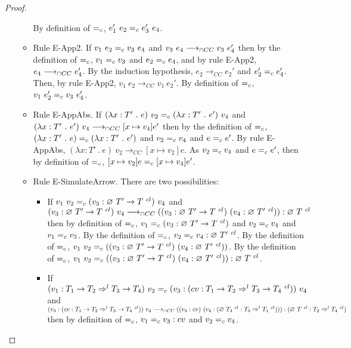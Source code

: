 \documentclass[a4paper]{article}
\begin{document}
\begin{proof}
\begin{itemize}
\begin{itemize}
        By definition of $=_c$, $e_1'\ e_2 \equalityCasts e_3'\ e_4$.
        \item Rule E-App2.
        If $v_1\ e_2 =_c v_3\ e_4$ and $v_3\ e_4 \longrightarrow_{\cap CC} v_3\ e_4'$ then by the definition of $=_c$, $v_1 =_c v_3$ and $e_2 =_c e_4$, and by rule E-App2, $e_4 \longrightarrow_{\cap CC} e_4'$.
        By the induction hypothesis, $e_2 \longrightarrow_{CC} e_2'$ and $e_2' =_c e_4'$.
        Then, by rule E-App2, $v_1\ e_2 \longrightarrow_{CC} v_1\ e_2'$.
        By definition of $=_c$, $v_1\ e_2' \equalityCasts v_3\ e_4'$.
        \item Rule E-AppAbs.
        If $(\lambda x : T'\ .\ e)\ v_2 \equalityCasts (\lambda x : T'\ .\ e')\ v_4$ and $(\lambda x : T'\ .\ e')\ v_4 \longrightarrow_{\cap CC} [x \mapsto v_4]e'$ then by the definition of $=_c$, $(\lambda x : T'\ .\ e) =_c (\lambda x : T'\ .\ e')$ and $v_2 =_c v_4$ and $e =_c e'$.
        By rule E-AppAbs, $(\lambda x : T'\ .\ e)\ v_2 \longrightarrow_{CC} [x \mapsto v_2]e$.
        As $v_2 =_c v_4$ and $e =_c e'$, then by definition of $=_c$, $[x \mapsto v_2]e =_c [x \mapsto v_4]e'$.
        \item Rule E-SimulateArrow.
        There are two possibilities:
        \begin{itemize}
            \item If $v_1\ v_2 =_c (v_3 : \varnothing\ T' \rightarrow T\ ^{cl})\ v_4$ and $(v_3 : \varnothing\ T' \rightarrow T\ ^{cl})\ v_4 \longrightarrow_{\cap CC} ((v_3 : \varnothing\ T' \rightarrow T\ ^{cl})\ (v_4 : \varnothing\ T'\ ^{cl})) : \varnothing\ T\ ^{cl}$ then by definition of $=_c$, $v_1 =_c (v_3 : \varnothing\ T' \rightarrow T\ ^{cl})$ and $v_2 =_c v_4$ and $v_1 =_c v_3$.
            By the definition of $=_c$, $v_2 =_c v_4 : \varnothing\ T'\ ^{cl}$.
            By the definition of $=_c$, $v_1\ v_2 =_c ((v_3 : \varnothing\ T' \rightarrow T\ ^{cl})\ (v_4 : \varnothing\ T'\ ^{cl}))$.
            By the definition of $=_c$, $v_1\ v_2 =_c ((v_3 : \varnothing\ T' \rightarrow T\ ^{cl})\ (v_4 : \varnothing\ T'\ ^{cl})) : \varnothing\ T\ ^{cl}$.
            \item If $(v_1 : T_1 \rightarrow T_2 \Rightarrow^l T_3 \rightarrow T_4)\ v_2 =_c (v_3 : (cv : T_1 \rightarrow T_2 \Rightarrow^l T_3 \rightarrow T_4\ ^{cl}))\ v_4$ and $(v_3 : (cv : T_1 \rightarrow T_2 \Rightarrow^l T_3 \rightarrow T_4\ ^{cl}))\ v_4 \longrightarrow_{\cap CC} ((v_3 : cv)\ (v_4 : (\varnothing\ T_3\ ^{cl} : T_3 \Rightarrow^l T_1\ ^{cl}))) : (\varnothing\ T\ ^{cl} : T_2 \Rightarrow^l T_4\ ^{cl})$ then by definition of $=_c$, $v_1 =_c v_3 : cv$ and $v_2 =_c v_4$.

\end{itemize}
\end{itemize}
\end{itemize}
\end{proof}
\end{document}
